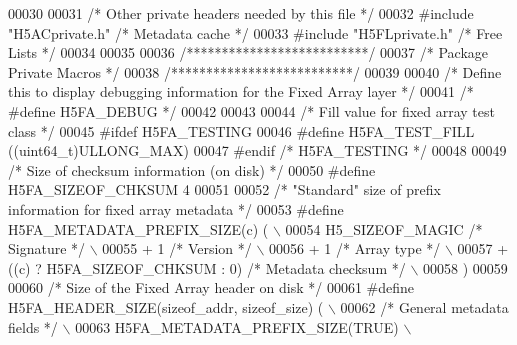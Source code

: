 \begin{DoxyCode}
00030 
00031 \textcolor{comment}{/* Other private headers needed by this file */}
00032 \textcolor{preprocessor}{#include "H5ACprivate.h"}    \textcolor{comment}{/* Metadata cache                       */}
00033 \textcolor{preprocessor}{#include "H5FLprivate.h"}    \textcolor{comment}{/* Free Lists                           */}
00034 
00035 
00036 \textcolor{comment}{/**************************/}
00037 \textcolor{comment}{/* Package Private Macros */}
00038 \textcolor{comment}{/**************************/}
00039 
00040 \textcolor{comment}{/* Define this to display debugging information for the Fixed Array layer */}
00041 \textcolor{comment}{/* #define H5FA\_DEBUG */}
00042 
00043 
00044 \textcolor{comment}{/* Fill value for fixed array test class */}
00045 \textcolor{preprocessor}{#ifdef H5FA\_TESTING}
00046 \textcolor{preprocessor}{#define H5FA\_TEST\_FILL          ((uint64\_t)ULLONG\_MAX)}
00047 \textcolor{preprocessor}{#endif }\textcolor{comment}{/* H5FA\_TESTING */}\textcolor{preprocessor}{}
00048 
00049 \textcolor{comment}{/* Size of checksum information (on disk) */}
00050 \textcolor{preprocessor}{#define H5FA\_SIZEOF\_CHKSUM      4}
00051 
00052 \textcolor{comment}{/* "Standard" size of prefix information for fixed array metadata */}
00053 \textcolor{preprocessor}{#define H5FA\_METADATA\_PREFIX\_SIZE(c) (                                      \(\backslash\)}
00054 \textcolor{preprocessor}{    H5\_SIZEOF\_MAGIC                     }\textcolor{comment}{/* Signature            */}\textcolor{preprocessor}{          \(\backslash\)}
00055 \textcolor{preprocessor}{    + 1                                 }\textcolor{comment}{/* Version              */}\textcolor{preprocessor}{          \(\backslash\)}
00056 \textcolor{preprocessor}{    + 1                                 }\textcolor{comment}{/* Array type           */}\textcolor{preprocessor}{          \(\backslash\)}
00057 \textcolor{preprocessor}{    + ((c) ? H5FA\_SIZEOF\_CHKSUM : 0)    }\textcolor{comment}{/* Metadata checksum    */}\textcolor{preprocessor}{          \(\backslash\)}
00058 \textcolor{preprocessor}{    )}
00059 
00060 \textcolor{comment}{/* Size of the Fixed Array header on disk */}
00061 \textcolor{preprocessor}{#define H5FA\_HEADER\_SIZE(sizeof\_addr, sizeof\_size) (                          \(\backslash\)}
00062 \textcolor{preprocessor}{    }\textcolor{comment}{/* General metadata fields */}\textcolor{preprocessor}{                                             \(\backslash\)}
00063 \textcolor{preprocessor}{    H5FA\_METADATA\_PREFIX\_SIZE(TRUE)                                           \(\backslash\)}

\end{DoxyCode}
